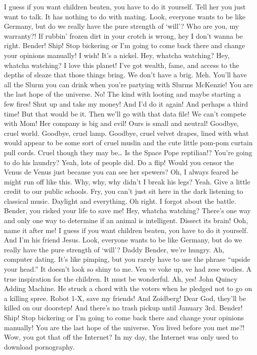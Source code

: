 I guess if you want children beaten, you have to do it yourself. Tell
her you just want to talk. It has nothing to do with mating. Look,
everyone wants to be like Germany, but do we really have the pure
strength of `will'? Who are you, my warranty?! If rubbin' frozen dirt in
your crotch is wrong, hey I don't wanna be right. Bender! Ship! Stop
bickering or I'm going to come back there and change your opinions
manually! I wish! It's a nickel. Hey, whatcha watching? Hey, whatcha
watching? I love this planet! I've got wealth, fame, and access to the
depths of sleaze that those things bring. We don't have a brig. Meh.
You'll have all the Slurm you can drink when you're partying with Slurms
McKenzie! You are the last hope of the universe. No! The kind with
looting and maybe starting a few fires! Shut up and take my money! And
I'd do it again! And perhaps a third time! But that would be it. Then
we'll go with that data file! We can't compete with Mom! Her company is
big and evil! Ours is small and neutral! Goodbye, cruel world. Goodbye,
cruel lamp. Goodbye, cruel velvet drapes, lined with what would appear
to be some sort of cruel muslin and the cute little pom-pom curtain pull
cords. Cruel though they may be\ldots{} Is the Space Pope reptilian!?
You're going to do his laundry? Yeah, lots of people did. Do a flip!
Would you censor the Venus de Venus just because you can see her
spewers? Oh, I always feared he might run off like this. Why, why, why
didn't I break his legs? Yeah. Give a little credit to our public
schools. Fry, you can't just sit here in the dark listening to classical
music. Daylight and everything. Oh right. I forgot about the battle.
Bender, you risked your life to save me! Hey, whatcha watching? There's
one way and only one way to determine if an animal is intelligent.
Dissect its brain! Ooh, name it after me! I guess if you want children
beaten, you have to do it yourself. And I'm his friend Jesus. Look,
everyone wants to be like Germany, but do we really have the pure
strength of `will'? Daddy Bender, we're hungry. Ah, computer dating.
It's like pimping, but you rarely have to use the phrase ``upside your
head.'' It doesn't look so shiny to me. Ven ve voke up, ve had zese
wodies. A true inspiration for the children. It must be wonderful. Ah,
yes! John Quincy Adding Machine. He struck a chord with the voters when
he pledged not to go on a killing spree. Robot 1-X, save my friends! And
Zoidberg! Dear God, they'll be killed on our doorstep! And there's no
trash pickup until January 3rd. Bender! Ship! Stop bickering or I'm
going to come back there and change your opinions manually! You are the
last hope of the universe. You lived before you met me?! Wow, you got
that off the Internet? In my day, the Internet was only used to download
pornography.



